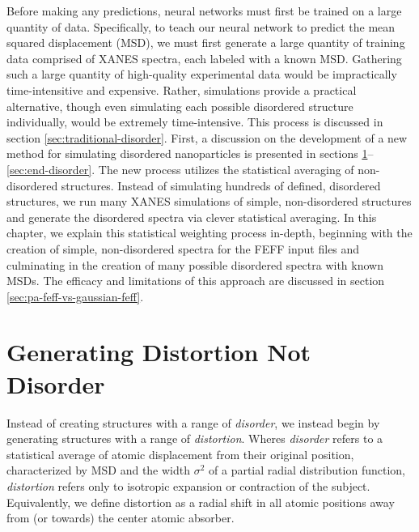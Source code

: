 
Before making any predictions, neural networks must first be trained on a large quantity of data. Specifically, to teach our neural network to predict the mean squared displacement (MSD), we must first generate a large quantity of training data comprised of XANES spectra, each labeled with a known MSD. Gathering such a large quantity of high-quality experimental data would be impractically time-intensitive and expensive. Rather, simulations provide a practical alternative, though even simulating each possible disordered structure individually, would be extremely time-intensive. This process is discussed in section \ref{sec:traditional-disorder}. First, a discussion on the development of a new method for simulating disordered nanoparticles is presented in sections \ref{sec:start-disorder}--\ref{sec:end-disorder}. The new process utilizes the statistical averaging of non-disordered structures. Instead of simulating hundreds of defined, disordered structures, we run many XANES simulations of simple, non-disordered structures and generate the disordered spectra via clever statistical averaging. In this chapter, we explain this statistical weighting process in-depth, beginning with the creation of simple, non-disordered spectra for the FEFF input files and culminating in the creation of many possible disordered spectra with known MSDs. The efficacy and limitations of this approach are discussed in section \ref{sec:pa-feff-vs-gaussian-feff}.

\section{Generating Distortion Not Disorder} \label{sec:start-disorder}
Instead of creating structures with a range of \textit{disorder}, we instead begin by generating structures with a range of \textit{distortion}. Wheres \textit{disorder} refers to a statistical average of atomic displacement from their original position, characterized by MSD and the width $ \sigma^2 $ of a partial radial distribution function, \textit{distortion} refers only to isotropic expansion or contraction of the subject. Equivalently, we define distortion as a radial shift in all atomic positions away from (or towards) the center atomic absorber.

